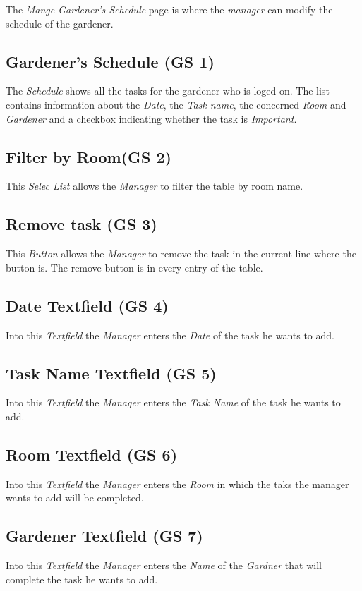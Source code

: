 The \emph{Mange Gardener's Schedule} page is where the \emph{manager}
can modify the schedule of the gardener.

\subsection{Gardener's Schedule (GS 1)}
The \emph{Schedule} shows all the tasks for the gardener who is loged on. The
list contains information about the \emph{Date}, the \emph{Task name}, the concerned \emph{Room} and \emph{Gardener} and a checkbox indicating
whether the task is \emph{Important}.

\subsection{Filter by Room(GS 2)}
This \emph{Selec List} allows the \emph{Manager} to filter the table by room
name.

\subsection{Remove task (GS 3)}
This \emph{Button} allows the \emph{Manager} to remove the task in the current
line where the button is. The remove button is in every entry of the table.

\subsection{Date Textfield (GS 4)}
Into this \emph{Textfield} the \emph{Manager} enters the \emph{Date} of the task
he wants to add.

\subsection{Task Name Textfield (GS 5)}
Into this \emph{Textfield} the \emph{Manager} enters the \emph{Task Name} of the
task he wants to add.

\subsection{Room Textfield (GS 6)}
Into this \emph{Textfield} the \emph{Manager} enters the \emph{Room} in which
the taks the manager wants to add will be completed.

\subsection{Gardener Textfield (GS 7)}
Into this \emph{Textfield} the \emph{Manager} enters the \emph{Name} of the
\emph{Gardner} that will complete the task he wants to add.

